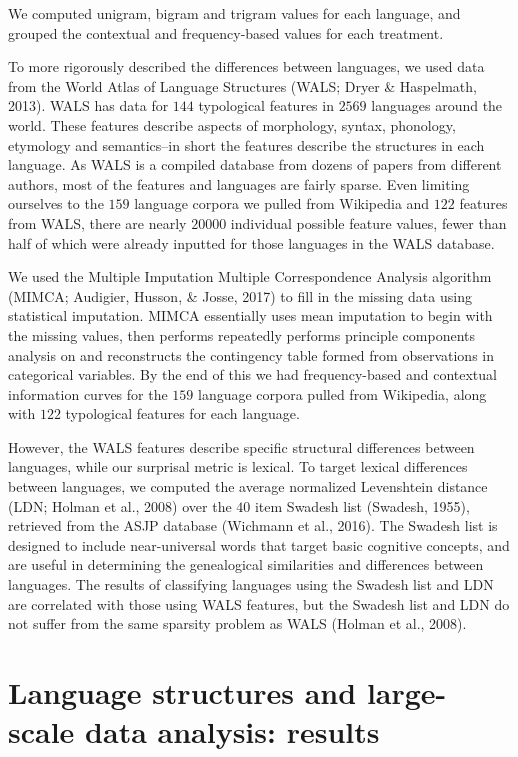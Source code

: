 \documentclass[man,floatsintext]{apa6}
\begin{document}
We computed unigram, bigram and trigram values for each language, and grouped the contextual and frequency-based values for each treatment.

To more rigorously described the differences between languages, we used data from the World Atlas of Language Structures (WALS; Dryer \& Haspelmath, 2013). WALS has data for \(144\) typological features in \(2569\) languages around the world. These features describe aspects of morphology, syntax, phonology, etymology and semantics--in short the features describe the structures in each language. As WALS is a compiled database from dozens of papers from different authors, most of the features and languages are fairly sparse. Even limiting ourselves to the \(159\) language corpora we pulled from Wikipedia and \(122\) features from WALS, there are nearly \(20000\) individual possible feature values, fewer than half of which were already inputted for those languages in the WALS database.

We used the Multiple Imputation Multiple Correspondence Analysis algorithm (MIMCA; Audigier, Husson, \& Josse, 2017) to fill in the missing data using statistical imputation. MIMCA essentially uses mean imputation to begin with the missing values, then performs repeatedly performs principle components analysis on and reconstructs the contingency table formed from observations in categorical variables. By the end of this we had frequency-based and contextual information curves for the \(159\) language corpora pulled from Wikipedia, along with \(122\) typological features for each language.

However, the WALS features describe specific structural differences between languages, while our surprisal metric is lexical. To target lexical differences between languages, we computed the average normalized Levenshtein distance (LDN; Holman et al., 2008) over the \(40\) item Swadesh list (Swadesh, 1955), retrieved from the ASJP database (Wichmann et al., 2016). The Swadesh list is designed to include near-universal words that target basic cognitive concepts, and are useful in determining the genealogical similarities and differences between languages. The results of classifying languages using the Swadesh list and LDN are correlated with those using WALS features, but the Swadesh list and LDN do not suffer from the same sparsity problem as WALS (Holman et al., 2008).

\hypertarget{language-structures-and-large-scale-data-analysis-results}{%
\section{Language structures and large-scale data analysis: results}\label{language-structures-and-large-scale-data-analysis-results}}
\end{document}
